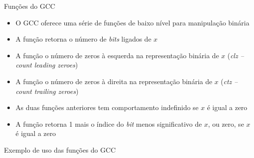 \begin{frame}[fragile]{Funções do GCC}

    \begin{itemize}
        \item O GCC oferece uma série de funções de baixo nível para manipulação
            binária

        \item A função  retorna o número de \textit{bits} ligados
            de $x$

        \item A função  o número de zeros à esquerda na representação
            binária de $x$ (\textit{clz -- count leading zeroes})

        \item A função  o número de zeros à direita na representação
            binária de $x$ (\textit{ctz -- count trailing zeroes})

        \item As duas funções anteriores tem comportamento indefinido se $x$ é igual a zero

        \item A função  retorna 1 mais o índice do \textit{bit} 
            menos significativo de $x$, ou zero, se $x$ é igual a zero

    \end{itemize}

\end{frame}

\begin{frame}[fragile]{Exemplo de uso das funções do GCC}
\end{frame}
